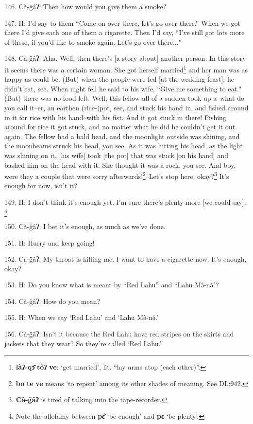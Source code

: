 146. Cà-g̈âʔ: Then how would you give them a smoke?

147. H: I'd say to them ``Come on over there, let's go over there.''
When we got there I'd give each one of them a cigarette. Then I'd say, ``I've
still got lots more of these, if you'd like to smoke again. Let's go over there..."

148. Cà-g̈âʔ: Aha. Well, then there's [a story about] another person. In this
story it seems there was a certain woman. She got herself married\footnote{\textbf{làʔ-qɔ̄} \textbf{tôʔ} \textbf{ve}: `get married', lit. ``lay arms atop (each other)''.} and her
man was as happy as could be. (But) when the people were fed [at the wedding feast],
he didn't eat, see. When night fell he said to his wife, ``Give me something
to eat." (But) there was no food left. Well, this fellow all of a sudden
took up a--what do you call it--er, an earthen (rice-)pot, see, and stuck his hand
in, and fished around in it for rice with his hand--with his fist. And it got stuck
in there! Fishing around for rice it got stuck, and no matter what he did he couldn't
get it out again. The fellow had a bald head, and the moonlight outside was shining,
and the moonbeams struck his head, you see. As it was hitting his head, as the
light was shining on it, [his wife] took [the pot] that was stuck [on his hand]
and bashed him on the head with it. She thought it was a rock, you see. And boy,
were they a couple that were sorry afterwards!\footnote{\textbf{bo} \textbf{te} \textbf{ve} means `to repent' among its other shades of meaning. See DL:942.}--Let's stop here, okay?\footnote{\textbf{Cà-g̈âʔ} is tired of talking into the tape-recorder.}
It's enough for now, isn't it?

149. H: I don't think it's enough yet. I'm sure there's plenty more [we could say].
\footnote{Note the allofamy between \textbf{pɛ̂} `be enough' and \textbf{pɛ} `be plenty'.}

150. Cà-g̈âʔ: I bet it's enough, as much as we've done.

151. H: Hurry and keep going!

152. Cà-g̈âʔ: My throat is killing me. I want to have a cigarette now. It's
enough, okay?

153. H: Do you know what is meant by ``Red Lahu'' and ``Lahu
Mə̂-nə́"?

154. Cà-g̈âʔ: How do you mean?

155. H: When we say `Red Lahu' and `Lahu Mə̂-nə́.'

156. Cà-g̈âʔ: Isn't it because the Red Lahu have red stripes on the skirts
and jackets that they wear? So they're called `Red Lahu.'

